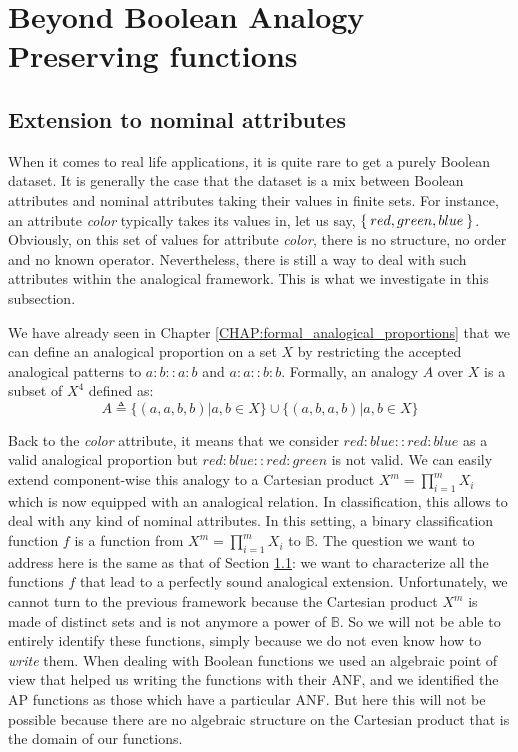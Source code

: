 \section{Beyond Boolean Analogy Preserving functions}

\subsection{Extension to nominal attributes}

When it comes to real life applications, it is quite rare to get a purely
Boolean dataset.  It is generally the case that the dataset  is  a mix between
Boolean attributes and nominal attributes taking their values in finite sets.
For instance, an attribute \textit{color} typically takes its values in, let us
say, $\Set{red, green,blue}$. Obviously, on this set of values for attribute
\textit{color}, there is no structure, no order and no known operator.
Nevertheless, there is still a way to deal with such attributes within the
analogical framework. This is what we investigate in this subsection.
 

We have already seen in Chapter \ref{CHAP:formal_analogical_proportions} that we
can define an analogical proportion on a set $X$ by restricting the accepted
analogical patterns to $a:b::a:b$ and $a:a::b:b$.  Formally, an analogy $A$
over $X$ is a subset of $X^4$ defined as:
$$A \triangleq  \{ (a,a,b,b)  | a, b \in X\} \cup \{ (a,b,a,b) | a, b \in X\}$$

Back to the \textit{color} attribute, it means that we consider
$red:blue::red:blue$ as a valid analogical proportion but $red:blue::red:green$
is not valid. We can easily extend component-wise this analogy to a Cartesian
product $X^m=\prod_{i=1}^m X_i$ which is now equipped with an analogical
relation. In classification, this allows to deal with any kind of nominal
attributes.  In this setting, a binary classification function $f$ is a
function from $X^m=\prod_{i=1}^m X_i$ to $\mathbb{B}$. The question we want to
address here is the same as that of Section \ref{}: we want to characterize all
the functions $f$ that lead to a perfectly sound analogical extension.
Unfortunately, we cannot turn to the previous framework because the Cartesian
product $X^m$ is made of distinct sets and is not anymore a power of
$\mathbb{B}$. So we will not be able to entirely identify these functions,
simply because we do not even know how to \textit{write} them. When dealing
with Boolean functions we used an algebraic point of view that helped us
writing the functions with their ANF, and we identified the AP functions as
those which have a particular ANF. But here this will not be possible because
there are no algebraic structure on the Cartesian product that is the domain of
our functions.

